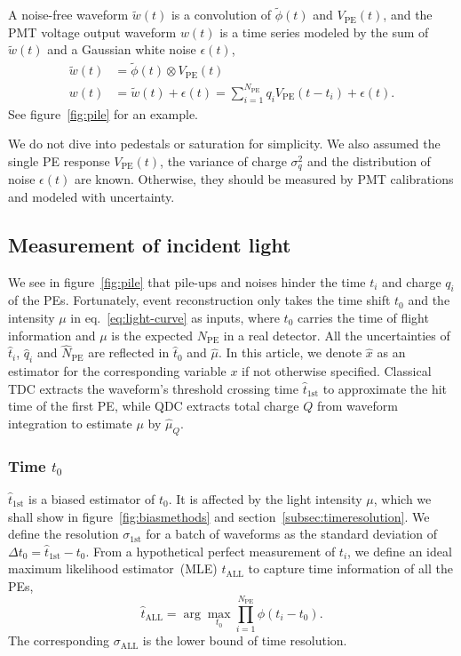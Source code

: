 A noise-free waveform $\tilde{w}(t)$ is a convolution of $\tilde{\phi}(t)$ and $V_\mathrm{PE}(t)$, and the PMT voltage output waveform $w(t)$ is a time series modeled by the sum of $\tilde{w}(t)$ and a Gaussian white noise $\epsilon(t)$,
\begin{equation}
  \label{eq:1}
  \begin{aligned}
    \tilde{w}(t) &= \tilde{\phi}(t) \otimes V_\mathrm{PE}(t) \\
    w(t) &= \tilde{w}(t) + \epsilon(t) = \sum_{i=1}^{N_\mathrm{PE}} q_i V_\mathrm{PE}(t-t_i) + \epsilon(t).
  \end{aligned}
\end{equation}
See figure~\ref{fig:pile} for an example.

We do not dive into pedestals or saturation for simplicity.  We also assumed the single PE response $V_\mathrm{PE}(t)$, the variance of charge $\sigma_q^2$ and the distribution of noise $\epsilon(t)$ are known.  Otherwise, they should be measured by PMT calibrations and modeled with uncertainty.


\subsection{Measurement of incident light}
\label{sec:time}
We see in figure~\ref{fig:pile} that pile-ups and noises hinder the time $t_i$ and charge $q_i$ of the PEs. Fortunately, event reconstruction only takes the time shift $t_0$ and the intensity $\mu$ in eq.~\eqref{eq:light-curve} as inputs, where $t_0$ carries the time of flight information and $\mu$ is the expected $N_\mathrm{PE}$ in a real detector.  All the uncertainties of $\hat{t}_i$, $\hat{q}_i$ and $\hat{N}_\mathrm{PE}$ are reflected in $\hat{t}_0$ and $\hat{\mu}$. In this article, we denote $\hat{x}$ as an estimator for the corresponding variable $x$ if not otherwise specified.  Classical TDC extracts the waveform's threshold crossing time $\hat{t}_\mathrm{1st}$ to approximate the hit time of the first PE, while QDC extracts total charge $Q$ from waveform integration to estimate $\mu$ by $\hat{\mu}_Q$.

\subsubsection{Time $t_0$}
\label{sec:time-shift-t_0}

$\hat{t}_\mathrm{1st}$ is a biased estimator of $t_0$.  It is affected by the light intensity $\mu$, which we shall show in figure~\ref{fig:biasmethods} and section~\ref{subsec:timeresolution}. We define the resolution $\sigma_\mathrm{1st}$ for a batch of waveforms as the standard deviation of $\Delta t_0 = \hat{t}_\mathrm{1st} - t_0$. From a hypothetical perfect measurement of $t_i$, we define an ideal maximum likelihood estimator~(MLE) $\hat{t}_\mathrm{ALL}$ to capture time information of all the PEs,
\begin{equation}
  \label{eq:2}
  \hat{t}_\mathrm{ALL} = \arg\underset{t_0}{\max} \prod_{i=1}^{N_\mathrm{PE}} \phi(t_i-t_0).
\end{equation}
The corresponding $\sigma_\mathrm{ALL}$ is the lower bound of time resolution. 

